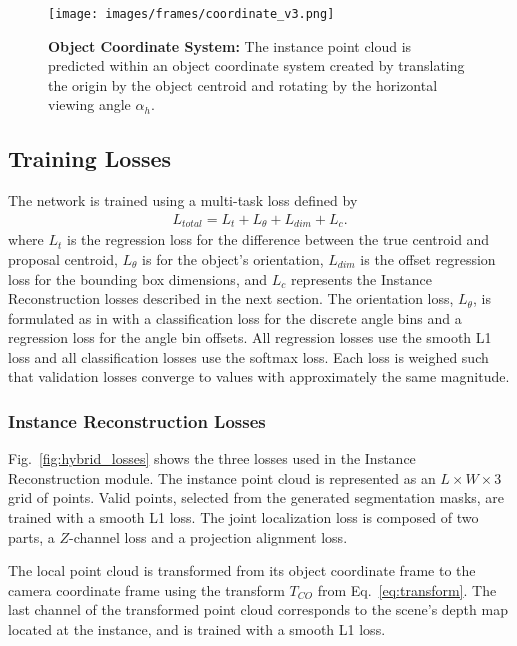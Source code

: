 \documentclass[10pt,twocolumn,letterpaper]{article}
\begin{document}
	\begin{figure}[t]
		\begin{center}
			\texttt{[image: images/frames/coordinate\_v3.png]}
		\end{center}
		\caption{\textbf{Object Coordinate System:} The instance point cloud is predicted within an object coordinate system created by translating the origin by the object centroid and rotating by the horizontal viewing angle $\alpha_h$.}
		\label{fig:pc_normalization}
	\end{figure}
		
	\subsection{Training Losses}\label{sec:losses}
	The network is trained using a multi-task loss defined by
	\begin{equation}
	\begin{aligned}
	L_{total} = L_{t} + L_{\theta} + L_{dim} + L_{c}.
	\end{aligned}
	\label{eq: losses}
	\end{equation}
where $L_{t}$ is the regression loss for the difference between the true centroid and proposal centroid, $L_{\theta}$ is for the object's orientation, $L_{dim}$ is the offset regression loss for the bounding box dimensions, and $L_{c}$ represents the Instance Reconstruction losses described in the next section. The orientation loss, $L_{\theta}$, is formulated as in \cite{qi_fpointnet} with a classification loss for the discrete angle bins and a regression loss for the angle bin offsets. All regression losses use the smooth L1 loss and all classification losses use the softmax loss. Each loss is weighed such that validation losses converge to values with approximately the same magnitude.
	
	\subsubsection{Instance Reconstruction Losses}
	Fig.~\ref{fig:hybrid_losses} shows the three losses used in the Instance Reconstruction module. The instance point cloud is represented as an $L \times W \times 3$ grid of points. Valid points, selected from the generated segmentation masks, are trained with a smooth L1 loss. The joint localization loss is composed of two parts, a $Z$-channel loss and a projection alignment loss.
	
	The local point cloud is transformed from its object coordinate frame to the camera coordinate frame using the transform $T_{CO}$ from Eq.~\ref{eq:transform}. The last channel of the transformed point cloud corresponds to the scene's depth map located at the instance, and is trained with a smooth L1 loss.
	
\end{document}
